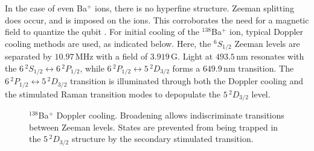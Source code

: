 \documentclass[12pt,a4paper]{amsart}
\numberwithin{equation}{section}
\theoremstyle{plain}
\theoremstyle{definition}
\begin{document}
In the case of even Ba$^+$ ions, there is no hyperfine structure. Zeeman splitting does occur, and is imposed on the ions. This corroborates the need for a magnetic field to quantize the qubit \cite{rareEartCool}. For initial cooling of the ${}^{138}$Ba$^+$ ion, typical Doppler cooling methods are used, as indicated below. Here, the ${}^6S_{1/2}$ Zeeman levels are separated by $10.97\,$MHz with a field of $3.919\,$G. Light at $493.5\,$nm resonates with the $6\,^2S_{1/2}\leftrightarrow 6\,^2P_{1/2}$, while $6\,^2P_{1/2}\leftrightarrow 5\,^2D_{3/2}$ forms a $649.9\,$nm   transition. 
The $6\,^2P_{1/2}\leftrightarrow 5\,^2D_{3/2}$ transition is illuminated through both the Doppler cooling and the stimulated Raman transition modes to depopulate the $5\,^2D_{3/2}$ level.
\begin{figure}
\centering
{}
    \caption{${}^{138}$Ba$^+$ Doppler cooling. Broadening allows indiscriminate transitions between Zeeman levels. States are prevented from being trapped in the $5\,^2D_{3/2}$ structure by the secondary stimulated transition. \cite{rareEartCool}}
    \label{fig:rareEartCool2}
\end{figure}
\end{document}
